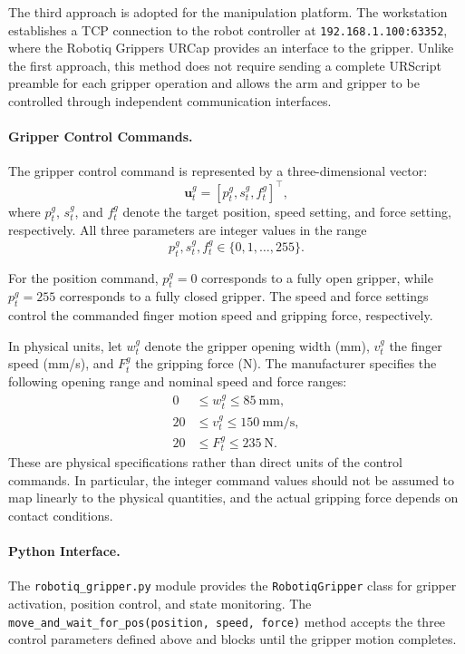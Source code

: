 \documentclass[11pt,a4paper]{article}
\begin{document}
The third approach is adopted for the manipulation platform. The workstation establishes a TCP connection to the robot controller at \texttt{192.168.1.100:63352}, where the Robotiq Grippers URCap provides an interface to the gripper. Unlike the first approach, this method does not require sending a complete URScript preamble for each gripper operation and allows the arm and gripper to be controlled through independent communication interfaces.

\paragraph{Gripper Control Commands.}
The gripper control command is represented by a three-dimensional vector:
\begin{equation}
    \mathbf{u}_t^g = [p_t^g, s_t^g, f_t^g]^\top,
\end{equation}
where $p_t^g$, $s_t^g$, and $f_t^g$ denote the target position, speed setting, and force setting, respectively. All three parameters are integer values in the range
\begin{equation}
    p_t^g, s_t^g, f_t^g \in \{0,1,\ldots,255\}.
\end{equation}

For the position command, $p_t^g=0$ corresponds to a fully open gripper, while $p_t^g=255$ corresponds to a fully closed gripper. The speed and force settings control the commanded finger motion speed and gripping force, respectively.

In physical units, let $w_t^g$ denote the gripper opening width (mm), $v_t^g$ the finger speed (mm/s), and $F_t^g$ the gripping force (N). The manufacturer specifies the following opening range and nominal speed and force ranges:
\begin{equation}
    \begin{aligned}
        0 &\leq w_t^g \leq 85 \ \mathrm{mm},\\
        20 &\leq v_t^g \leq 150 \ \mathrm{mm/s},\\
        20 &\leq F_t^g \leq 235 \ \mathrm{N}.
    \end{aligned}
\end{equation}
These are physical specifications rather than direct units of the control commands. In particular, the integer command values should not be assumed to map linearly to the physical quantities, and the actual gripping force depends on contact conditions.

\paragraph{Python Interface.}
The \texttt{robotiq\_gripper.py} module provides the \texttt{RobotiqGripper} class for gripper activation, position control, and state monitoring. The \texttt{move\_and\_wait\_for\_pos(position, speed, force)} method accepts the three control parameters defined above and blocks until the gripper motion completes.
\end{document}
